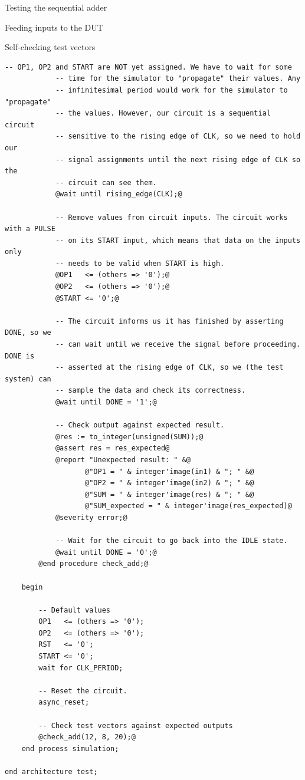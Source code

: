 \documentclass[lab]{course}
\begin{document}
\begin{section}{Testing the sequential adder}
\begin{subsection}{Feeding inputs to the DUT}
\begin{subsubsection}{Self-checking test vectors}
\begin{lstlisting}[caption={Add test vectors}, label={lst:sequential_process_simulation_test_vectors}]
            -- OP1, OP2 and START are NOT yet assigned. We have to wait for some
            -- time for the simulator to "propagate" their values. Any
            -- infinitesimal period would work for the simulator to "propagate"
            -- the values. However, our circuit is a sequential circuit
            -- sensitive to the rising edge of CLK, so we need to hold our
            -- signal assignments until the next rising edge of CLK so the
            -- circuit can see them.
            @wait until rising_edge(CLK);@

            -- Remove values from circuit inputs. The circuit works with a PULSE
            -- on its START input, which means that data on the inputs only
            -- needs to be valid when START is high.
            @OP1   <= (others => '0');@
            @OP2   <= (others => '0');@
            @START <= '0';@

            -- The circuit informs us it has finished by asserting DONE, so we
            -- can wait until we receive the signal before proceeding. DONE is
            -- asserted at the rising edge of CLK, so we (the test system) can
            -- sample the data and check its correctness.
            @wait until DONE = '1';@

            -- Check output against expected result.
            @res := to_integer(unsigned(SUM));@
            @assert res = res_expected@
            @report "Unexpected result: " &@
                   @"OP1 = " & integer'image(in1) & "; " &@
                   @"OP2 = " & integer'image(in2) & "; " &@
                   @"SUM = " & integer'image(res) & "; " &@
                   @"SUM_expected = " & integer'image(res_expected)@
            @severity error;@

            -- Wait for the circuit to go back into the IDLE state.
            @wait until DONE = '0';@
        @end procedure check_add;@

    begin

        -- Default values
        OP1   <= (others => '0');
        OP2   <= (others => '0');
        RST   <= '0';
        START <= '0';
        wait for CLK_PERIOD;

        -- Reset the circuit.
        async_reset;

        -- Check test vectors against expected outputs
        @check_add(12, 8, 20);@
    end process simulation;

end architecture test;
            \end{lstlisting}


\end{subsubsection}
\end{subsection}
\end{section}
\end{document}
